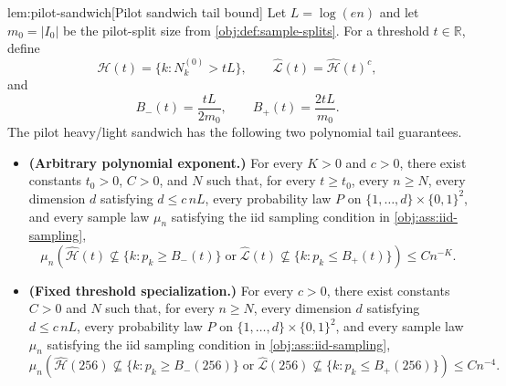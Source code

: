 \begin{lemmav}{lem:pilot-sandwich}[Pilot sandwich tail bound]
Let \(L=\log(en)\) and let \(m_0=|I_0|\) be the pilot-split size from \cref{obj:def:sample-splits}.  For a threshold \(t\in\mathbb R\), define
\[
\widehat{\mathcal H}(t)=\{k:N_k^{(0)}>tL\},\qquad
\widehat{\mathcal L}(t)=\widehat{\mathcal H}(t)^c,
\]
and
\[
B_-(t)=\frac{tL}{2m_0},\qquad
B_+(t)=\frac{2tL}{m_0}.
\]
The pilot heavy/light sandwich has the following two polynomial tail guarantees.
\begin{itemize}
\item \textbf{(Arbitrary polynomial exponent.)} For every \(K>0\) and \(c>0\), there exist constants \(t_0>0\), \(C>0\), and \(N\) such that, for every \(t\ge t_0\), every \(n\ge N\), every dimension \(d\) satisfying \(d\le c\,nL\), every probability law \(P\) on \(\{1,\ldots,d\}\times\{0,1\}^2\), and every sample law \(\mu_n\) satisfying the iid sampling condition in \cref{obj:ass:iid-sampling},
\[
\mu_n\!\left(
\widehat{\mathcal H}(t)\not\subseteq\{k:p_k\ge B_-(t)\}
\;\text{or}\;
\widehat{\mathcal L}(t)\not\subseteq\{k:p_k\le B_+(t)\}
\right)
\le C n^{-K}.
\]
\item \textbf{(Fixed threshold specialization.)} For every \(c>0\), there exist constants \(C>0\) and \(N\) such that, for every \(n\ge N\), every dimension \(d\) satisfying \(d\le c\,nL\), every probability law \(P\) on \(\{1,\ldots,d\}\times\{0,1\}^2\), and every sample law \(\mu_n\) satisfying the iid sampling condition in \cref{obj:ass:iid-sampling},
\[
\mu_n\!\left(
\widehat{\mathcal H}(256)\not\subseteq\{k:p_k\ge B_-(256)\}
\;\text{or}\;
\widehat{\mathcal L}(256)\not\subseteq\{k:p_k\le B_+(256)\}
\right)
\le C n^{-4}.
\]
\end{itemize}
\end{lemmav}

